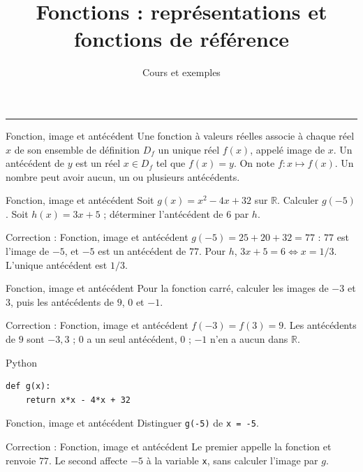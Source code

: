 \documentclass[aspectratio=169,10pt]{beamer}
\title{Fonctions : représentations et fonctions de référence}
\subtitle{Cours et exemples}
\date{}
\author{}
\providecommand{\R}{\mathbb{R}}
\begin{document}
\begin{frame}[plain]
\vfill
{\inserttitle\par}
\medskip
{\insertsubtitle\par}
\medskip
{\rule{\textwidth}{.5pt}}
\vfill
\end{frame}
\begin{frame}{Fonction, image et antécédent}
Une fonction à valeurs réelles associe à chaque réel \(x\) de son ensemble de définition \(D_f\) un unique réel \(f(x)\), appelé image de \(x\). Un antécédent de \(y\) est un réel \(x\in D_f\) tel que \(f(x)=y\). On note \(f:x\mapsto f(x)\). Un nombre peut avoir aucun, un ou plusieurs antécédents.
\end{frame}
\begin{frame}{Fonction, image et antécédent}
Soit \(g(x)=x^2-4x+32\) sur \(\R\). Calculer \(g(-5)\). Soit \(h(x)=3x+5\) ; déterminer l'antécédent de \(6\) par \(h\).
\end{frame}
\begin{frame}{Correction : Fonction, image et antécédent}
\(g(-5)=25+20+32=77\) : \(77\) est l'image de \(-5\), et \(-5\) est un antécédent de \(77\). Pour \(h\), \(3x+5=6\iff x=1/3\). L'unique antécédent est \(1/3\).
\end{frame}
\begin{frame}{Fonction, image et antécédent}
Pour la fonction carré, calculer les images de \(-3\) et \(3\), puis les antécédents de \(9\), \(0\) et \(-1\).
\end{frame}
\begin{frame}{Correction : Fonction, image et antécédent}
\(f(-3)=f(3)=9\). Les antécédents de \(9\) sont \(-3,3\) ; \(0\) a un seul antécédent, \(0\) ; \(-1\) n'en a aucun dans \(\R\).
\end{frame}
\begin{frame}[fragile]{Python}
\small
\begin{verbatim}
def g(x):
    return x*x - 4*x + 32
\end{verbatim}
\end{frame}
\begin{frame}{Fonction, image et antécédent}
Distinguer \texttt{g(-5)} de \texttt{x = -5}.
\end{frame}
\begin{frame}{Correction : Fonction, image et antécédent}
Le premier appelle la fonction et renvoie \(77\). Le second affecte \(-5\) à la variable \texttt{x}, sans calculer l'image par \(g\).
\end{frame}
\end{document}
